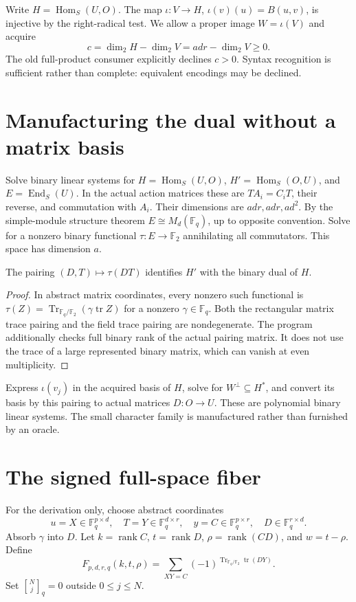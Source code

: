 \documentclass[11pt]{article}
\newcommand{\F}{\mathbb F}\newcommand{\Hom}{\operatorname{Hom}}
\newcommand{\End}{\operatorname{End}}\newcommand{\rank}{\operatorname{rank}}
\begin{document}
Write $H=\Hom_S(U,O)$. The map $\iota:V\to H$,
$\iota(v)(u)=B(u,v)$, is injective by the right-radical test. We allow a proper
image $W=\iota(V)$ and acquire
\[
 c=\dim_2H-\dim_2V=adr-\dim_2V\geq0.
\]
The old full-product consumer explicitly declines $c>0$. Syntax recognition
is sufficient rather than complete: equivalent encodings may be declined.

\section{Manufacturing the dual without a matrix basis}
Solve binary linear systems for $H=\Hom_S(U,O)$,
$H'=\Hom_S(O,U)$, and $E=\End_S(U)$. In the actual action matrices these
are $TA_i=C_iT$, their reverse, and commutation with $A_i$. Their dimensions
are $adr,adr,ad^2$. By the simple-module structure theorem
$E\cong M_d(\F_q)$, up to opposite convention. Solve for a nonzero binary
functional $\tau:E\to\F_2$ annihilating all commutators. This space has
dimension $a$.

\begin{lemma}
The pairing $(D,T)\mapsto\tau(DT)$ identifies $H'$ with the binary dual of $H$.
\end{lemma}
\begin{proof}
In abstract matrix coordinates, every nonzero such functional is
$\tau(Z)=\operatorname{Tr}_{\F_q/\F_2}(\gamma\operatorname{tr}Z)$ for a
nonzero $\gamma\in\F_q$. Both the rectangular matrix trace pairing and the
field trace pairing are nondegenerate. The program additionally checks full
binary rank of the actual pairing matrix. It does not use the trace of a
large represented binary matrix, which can vanish at even multiplicity.
\end{proof}

Express $\iota(v_j)$ in the acquired basis of $H$, solve for
$W^\perp\subseteq H^*$, and convert its basis by this pairing to actual
matrices $D:O\to U$. These are polynomial binary linear systems. The small
character family is manufactured rather than furnished by an oracle.

\section{The signed full-space fiber}
For the derivation only, choose abstract coordinates
\[
 u=X\in\F_q^{p\times d},\quad T=Y\in\F_q^{d\times r},\quad
 y=C\in\F_q^{p\times r},\quad D\in\F_q^{r\times d}.
\]
Absorb $\gamma$ into $D$. Let $k=\rank C$, $t=\rank D$,
$\rho=\rank(CD)$, and $w=t-\rho$. Define
\[
 F_{p,d,r,q}(k,t,\rho)=\sum_{XY=C}
 (-1)^{\operatorname{Tr}_{\F_q/\F_2}\operatorname{tr}(DY)}.
\]
Set ${N\brack j}_q=0$ outside $0\leq j\leq N$.
\end{document}
